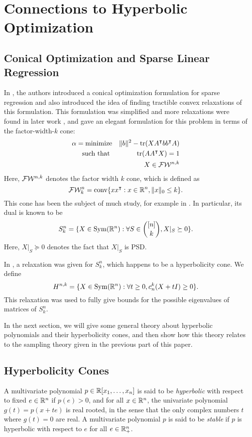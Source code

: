 \documentclass{amsart}
\theoremstyle{definition}
\numberwithin{equation}{section}
\begin{document}
\section{Connections to Hyperbolic Optimization}\label{sec:hyperbolicity}
\subsection{Conical Optimization and Sparse Linear Regression}
In \cite{atamturk2019rank}, the authors introduced a conical optimization formulation for sparse regression and also introduced the idea of finding tractible convex relaxations of this formulation.
This formulation was simplified and more relaxations were found in later work \cite{bach2010convex}, and \cite{BENAMEUR2022425} gave an elegant formulation for this problem in terms of the factor-width-$k$ cone:
\begin{equation}\label{eq:cvx_prg}
\begin{aligned}
    \alpha = 
    \text{minimize} &&\|b\|^2 - \operatorname*{tr}(XA^{\intercal}bb^{\intercal}A)\\
    \text{such that } && \operatorname*{tr}(AA^{\intercal}X) = 1\\
                      && X \in \mathcal{F}\mathcal{W}^{n,k}
\end{aligned}
\end{equation}
Here, $\mathcal{F}\mathcal{W}^{n,k}$ denotes the factor width $k$ cone, which is defined as 
\[
    \mathcal{F}\mathcal{W}^n_k = \operatorname*{conv} \{xx^{\intercal} : x \in \mathbb{R}^{n}, \|x\|_0 \le k\}.
\]
This cone has been the subject of much study, for example in \cite{boman2005factor}. In particular, its dual is known to be 
\[
    S^n_k = \{X \in \operatorname*{Sym}(\mathbb{R}^n) : \forall S\in \binom{[n]}{k}, X|_S \succeq 0 \}.
\]
Here, $X|_S \succeq 0$ denotes the fact that $X|_S$ is PSD.

In \cite{blekherman2020hyperbolic}, a relaxation was given for $S^n_k$, which happens to be a hyperbolicity cone.
We define
\[
    H^{n,k} = \{X \in \operatorname*{Sym}(\mathbb{R}^n) : \forall t\ge 0, c^k_n(X+tI) \ge 0\}.
\]
This relaxation was used to fully give bounds for the possible eigenvalues of matrices of $S^n_k$.

In the next section, we will give some general theory about hyperbolic polynomials and their hyperbolicity cones, and then show how this theory relates to the sampling theory given in the previous part of this paper.
\subsection{Hyperbolicity Cones}
A multivariate polynomial $p \in \mathbb{R}[x_1 ,\dots, x_n]$ is said to be \emph{hyperbolic} with respect to fixed $e \in \mathbb{R}^n$ if $p(e) > 0$, and for all $x \in \mathbb{R}^n$, the univariate polynomial $g(t) = p(x+te)$ is real rooted, in the sense that the only complex numbers $t$ where $g(t) = 0$ are real.
A multivariate polynomial $p$ is said to be \emph{stable} if $p$ is hyperbolic with respect to $e$ for all $e \in \mathbb{R}_+^n$.
\end{document}
